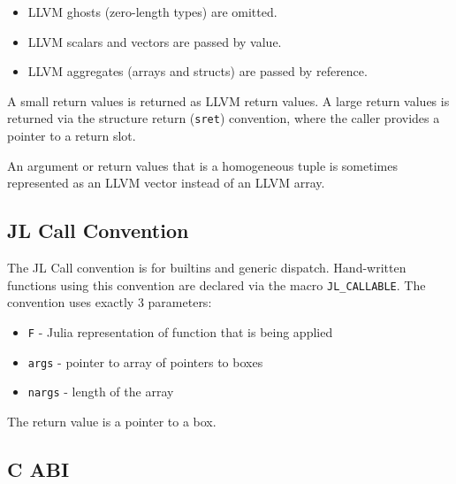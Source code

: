 \begin{itemize}
\item LLVM ghosts (zero-length types) are omitted.


\item LLVM scalars and vectors are passed by value.


\item LLVM aggregates (arrays and structs) are passed by reference.

\end{itemize}


A small return values is returned as LLVM return values. A large return values is returned via the {\textquotedbl}structure return{\textquotedbl} (\texttt{sret}) convention, where the caller provides a pointer to a return slot.



An argument or return values that is a homogeneous tuple is sometimes represented as an LLVM vector instead of an LLVM array.



\hypertarget{10962628785392118342}{}


\subsection{JL Call Convention}



The JL Call convention is for builtins and generic dispatch. Hand-written functions using this convention are declared via the macro \texttt{JL\_CALLABLE}. The convention uses exactly 3 parameters:



\begin{itemize}
\item \texttt{F}  - Julia representation of function that is being applied


\item \texttt{args} - pointer to array of pointers to boxes


\item \texttt{nargs} - length of the array

\end{itemize}


The return value is a pointer to a box.



\hypertarget{16764615067045412370}{}


\subsection{C ABI}



